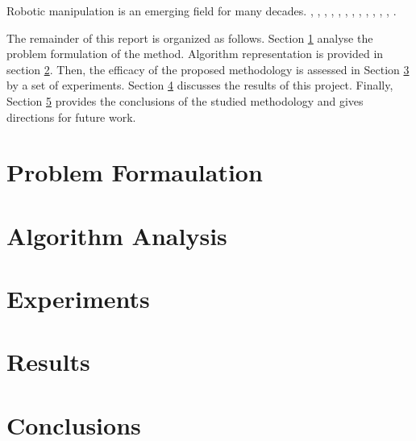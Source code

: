 \documentclass[letterpaper, 10 pt, conference]{ieeeconf}
\begin{document}
Robotic manipulation is an emerging field for many decades. \cite{chang2012interactive}, \cite{sturm2010vision}, \cite{katz2014interactive}, \cite{thrun2005probabilistic}, \cite{tomasi1991detection}, \cite{brock2009learning}, \cite{krainin2011manipulator}, \cite{wuthrich2013probabilistic}, \cite{choi2013rgb}, \cite{mishra2009active}, \cite{yuheng2013star3d}, \cite{herbst2014toward}, \cite{pomerleau2011tracking}.

The remainder of this report is organized as follows. Section \ref{pf} analyse the problem formulation of the method. Algorithm representation is provided in section \ref{algAn}. Then, the efficacy of the proposed methodology is assessed in Section \ref{experim} by a set of experiments. Section \ref{resul} discusses the results of this project. Finally, Section \ref{concl} provides the conclusions of the studied methodology and gives directions for future work.  


\section{Problem Formaulation}\label{pf}


















\section{Algorithm Analysis}\label{algAn}

\section{Experiments}\label{experim}

\section{Results}\label{resul}

\section{Conclusions}\label{concl}



\end{document}
